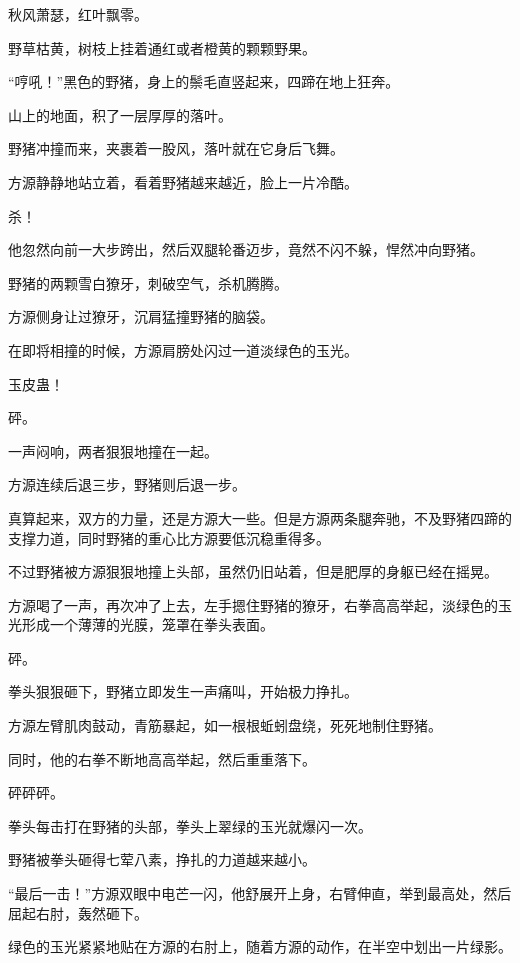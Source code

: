 
\begin{this_body}

秋风萧瑟，红叶飘零。

野草枯黄，树枝上挂着通红或者橙黄的颗颗野果。

“哼吼！”黑色的野猪，身上的鬃毛直竖起来，四蹄在地上狂奔。

山上的地面，积了一层厚厚的落叶。

野猪冲撞而来，夹裹着一股风，落叶就在它身后飞舞。

方源静静地站立着，看着野猪越来越近，脸上一片冷酷。

杀！

他忽然向前一大步跨出，然后双腿轮番迈步，竟然不闪不躲，悍然冲向野猪。

野猪的两颗雪白獠牙，刺破空气，杀机腾腾。

方源侧身让过獠牙，沉肩猛撞野猪的脑袋。

在即将相撞的时候，方源肩膀处闪过一道淡绿色的玉光。

玉皮蛊！

砰。

一声闷响，两者狠狠地撞在一起。

方源连续后退三步，野猪则后退一步。

真算起来，双方的力量，还是方源大一些。但是方源两条腿奔驰，不及野猪四蹄的支撑力道，同时野猪的重心比方源要低沉稳重得多。

不过野猪被方源狠狠地撞上头部，虽然仍旧站着，但是肥厚的身躯已经在摇晃。

方源喝了一声，再次冲了上去，左手摁住野猪的獠牙，右拳高高举起，淡绿色的玉光形成一个薄薄的光膜，笼罩在拳头表面。

砰。

拳头狠狠砸下，野猪立即发生一声痛叫，开始极力挣扎。

方源左臂肌肉鼓动，青筋暴起，如一根根蚯蚓盘绕，死死地制住野猪。

同时，他的右拳不断地高高举起，然后重重落下。

砰砰砰。

拳头每击打在野猪的头部，拳头上翠绿的玉光就爆闪一次。

野猪被拳头砸得七荤八素，挣扎的力道越来越小。

“最后一击！”方源双眼中电芒一闪，他舒展开上身，右臂伸直，举到最高处，然后屈起右肘，轰然砸下。

绿色的玉光紧紧地贴在方源的右肘上，随着方源的动作，在半空中划出一片绿影。


\end{this_body}
